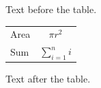 \documentclass[12pt]{article}
\begin{document}
Text before the table.

\begin{tabular}{lc}Area & $\pi r^2$\\Sum & $\sum_{i=1}^n i$\end{tabular}

Text after the table.
\end{document}
